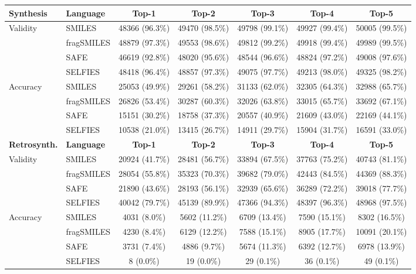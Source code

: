 \begin{tabular}{llccccc}
    \toprule
    \textbf{Synthesis} & \textbf{Language} & \textbf{Top-1} & \textbf{Top-2} & \textbf{Top-3} & \textbf{Top-4} & \textbf{Top-5} \\
    \toprule
    Validity & SMILES & 48366 (96.3\%) & 49470 (98.5\%) & 49798 (99.1\%) & 49927 (99.4\%) & 50005 (99.5\%) \\
    ~ & fragSMILES & 48879 (97.3\%) & 49553 (98.6\%) & 49812 (99.2\%) & 49918 (99.4\%) & 49989 (99.5\%) \\
    ~ & SAFE & 46619 (92.8\%) & 48020 (95.6\%) & 48544 (96.6\%) & 48824 (97.2\%) & 49008 (97.6\%) \\
    ~ & SELFIES & 48418 (96.4\%) & 48857 (97.3\%) & 49075 (97.7\%) & 49213 (98.0\%) & 49325 (98.2\%) \\
    \hline
    Accuracy & SMILES & 25053 (49.9\%) & 29261 (58.2\%) & 31133 (62.0\%) & 32305 (64.3\%) & 32988 (65.7\%) \\
    ~ & fragSMILES & 26826 (53.4\%) & 30287 (60.3\%) & 32026 (63.8\%) & 33015 (65.7\%) & 33692 (67.1\%) \\
    ~ & SAFE & 15151 (30.2\%) & 18758 (37.3\%) & 20557 (40.9\%) & 21609 (43.0\%) & 22169 (44.1\%) \\
    ~ & SELFIES & 10538 (21.0\%) & 13415 (26.7\%) & 14911 (29.7\%) & 15904 (31.7\%) & 16591 (33.0\%) \\
    \toprule
    \textbf{Retrosynth.} &  \textbf{Language} & \textbf{Top-1} & \textbf{Top-2} & \textbf{Top-3} & \textbf{Top-4} & \textbf{Top-5}\\
    \toprule
    Validity & SMILES & 20924 (41.7\%) & 28481 (56.7\%) & 33894 (67.5\%) & 37763 (75.2\%) & 40743 (81.1\%) \\
    ~ & fragSMILES & 28054 (55.8\%) & 35323 (70.3\%) & 39682 (79.0\%) & 42443 (84.5\%) & 44369 (88.3\%) \\
    ~ & SAFE & 21890 (43.6\%) & 28193 (56.1\%) & 32939 (65.6\%) & 36289 (72.2\%) & 39018 (77.7\%) \\
    ~ & SELFIES & 40042 (79.7\%) & 45139 (89.9\%) & 47366 (94.3\%) & 48397 (96.3\%) & 48968 (97.5\%) \\
    \hline
    Accuracy & SMILES & 4031 (8.0\%) & 5602 (11.2\%) & 6709 (13.4\%) & 7590 (15.1\%) & 8302 (16.5\%) \\
    ~ & fragSMILES & 4230 (8.4\%) & 6129 (12.2\%) & 7588 (15.1\%) & 8905 (17.7\%) & 10091 (20.1\%) \\
    ~ & SAFE & 3731 (7.4\%) & 4886 (9.7\%) & 5674 (11.3\%) & 6392 (12.7\%) & 6978 (13.9\%) \\
    ~ & SELFIES & 8 (0.0\%) & 19 (0.0\%) & 29 (0.1\%) & 36 (0.1\%) & 49 (0.1\%) \\
    \bottomrule
\end{tabular}